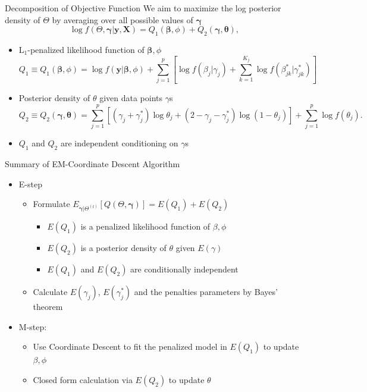 \documentclass[
  ignorenonframetext,
  aspectratio=169]{beamer}
\providecommand{\tightlist}{%
  \setlength{\itemsep}{0pt}\setlength{\parskip}{0pt}}
\newcommand{\bs}[1]{\boldsymbol{#1}}
\newcommand{\tp}{*}
\begin{document}
\begin{frame}{Decomposition of Objective Function}
\protect\hypertarget{decomposition-of-objective-function}{}
We aim to maximize the log posterior density of \(\Theta\) by averaging
over all possible values of \(\bm \gamma\)
\[ \log f(\Theta, \bs \gamma| \textbf{y}, \textbf{X}) = Q_1(\bs \beta, \phi) + Q_2 (\bs \gamma,\bs \theta),\]

\begin{itemize}
\item
  L\(_1\)-penalized likelihood function of \(\bs \beta, \phi\)
  \[Q_1 \equiv Q_1(\bs \beta, \phi) = \log f(\textbf{y}|\bs \beta, \phi) + \sum\limits_{j=1}^p\left[\log f(\beta_j|\gamma_j)+\sum\limits_{k=1}^{K_j} \log f(\beta^{\tp}_{jk}|\gamma^{\tp}_{jk})\right]\]
\item
  Posterior density of \(\theta\) given data points \(\gamma\)s
  \[Q_2 \equiv Q_2(\bs\gamma,\bs\theta) = \sum\limits_{j=1}^{p} \left[ (\gamma_j+\gamma_{j}^{\tp})\log \theta_j + (2-\gamma_j-\gamma_{j}^{\tp}) \log (1-\theta_j)\right] +  \sum\limits_{j=1}^{p}\log f(\theta_j).\]
\item
  \(Q_1\) and \(Q_2\) are independent conditioning on \(\gamma\)s
\end{itemize}
\end{frame}

\begin{frame}{Summary of EM-Coordinate Descent Algorithm}
\protect\hypertarget{summary-of-em-coordinate-descent-algorithm}{}
\begin{itemize}
\tightlist
\item
  E-step

  \begin{itemize}
  \tightlist
  \item
    Formulate
    \(E_{\bm \gamma|\Theta^{(t)}}\left[Q(\Theta, \bm \gamma)\right] = E(Q_1) + E(Q_2)\)

    \begin{itemize}
    \tightlist
    \item
      \(E(Q_1)\) is a penalized likelihood function of \(\beta, \phi\)
    \item
      \(E(Q_2)\) is a posterior density of \(\theta\) given
      \(E(\gamma)\)
    \item
      \(E(Q_1)\) and \(E(Q_2)\) are conditionally independent
    \end{itemize}
  \item
    Calculate \(E(\gamma_{j})\), \(E(\gamma^\tp_{j})\) and the penalties
    parameters by Bayes' theorem
  \end{itemize}
\item
  M-step:

  \begin{itemize}
  \tightlist
  \item
    Use Coordinate Descent to fit the penalized model in \(E(Q_1)\) to
    update \(\beta, \phi\)
  \item
    Closed form calculation via \(E(Q_2)\) to update \(\theta\)
  \end{itemize}
\end{itemize}
\end{frame}
\end{document}
